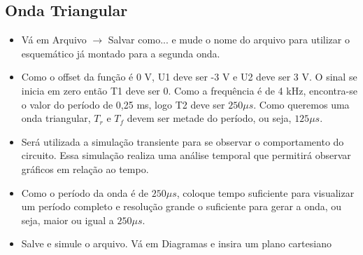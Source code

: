 
\subsection{Onda Triangular}

\begin{itemize}
    \item Vá em Arquivo $\rightarrow$ Salvar como... e mude o nome do
    arquivo para utilizar o esquemático já montado para
    a segunda onda.

    \item Como o offset da função é 0 V, U1 deve ser -3 V e U2
    deve ser 3 V. O sinal se inicia em zero então T1 deve
    ser 0. Como a frequência é de 4 kHz, encontra-se o
    valor do período de 0,25 ms, logo T2 deve ser $250 \mu s$.
    Como queremos uma onda triangular, $T_r$ e $T_f$ devem
    ser metade do período, ou seja, $125\mu s$.
\end{itemize}


\begin{itemize}
    \item Será utilizada a simulação transiente para se
    observar o comportamento do circuito. Essa
    simulação realiza uma análise temporal que permitirá
    observar gráficos em relação ao tempo.
\end{itemize}



\begin{itemize}
    \item Como o período da onda é de $250 \mu s$, coloque
    tempo suficiente para visualizar um período
    completo e resolução grande o suficiente para gerar
    a onda, ou seja, maior ou igual a $250 \mu s$.
\end{itemize}


\begin{itemize}
    \item Salve e simule o arquivo. Vá em Diagramas e insira um plano cartesiano
\end{itemize}

